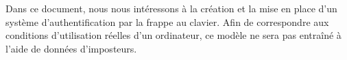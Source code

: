 Dans ce document, nous nous intéressons à la création et la mise en place d'un système d'authentification par la frappe au clavier. Afin de correspondre aux conditions d'utilisation réelles d'un ordinateur, ce modèle ne sera pas entraîné à l'aide de données d'imposteurs.